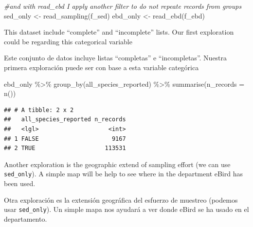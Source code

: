 \documentclass[
]{article}
\newenvironment{Shaded}{\begin{snugshade}}{\end{snugshade}}
\newcommand{\AttributeTok}[1]{\textcolor[rgb]{0.77,0.63,0.00}{#1}}
\newcommand{\CommentTok}[1]{\textcolor[rgb]{0.56,0.35,0.01}{\textit{#1}}}
\newcommand{\FunctionTok}[1]{\textcolor[rgb]{0.00,0.00,0.00}{#1}}
\newcommand{\NormalTok}[1]{#1}
\newcommand{\OtherTok}[1]{\textcolor[rgb]{0.56,0.35,0.01}{#1}}
\newcommand{\SpecialCharTok}[1]{\textcolor[rgb]{0.00,0.00,0.00}{#1}}
\begin{document}
\begin{Shaded}
\begin{Highlighting}[]
\CommentTok{\#and with read\_ebd I apply another filter to do not repeate records from groups}
\NormalTok{sed\_only }\OtherTok{\textless{}{-}} \FunctionTok{read\_sampling}\NormalTok{(f\_sed)}
\NormalTok{ebd\_only }\OtherTok{\textless{}{-}} \FunctionTok{read\_ebd}\NormalTok{(f\_ebd)}
\end{Highlighting}
\end{Shaded}

This dataset include ``complete'' and ``incomplete'' lists. Our first
exploration could be regarding this categorical variable

Este conjunto de datos incluye listas ``completas'' e ``incompletas''.
Nuestra primera exploración puede ser con base a esta variable
categórica

\begin{Shaded}
\begin{Highlighting}[]
\NormalTok{ebd\_only }\SpecialCharTok{\%\textgreater{}\%}
  \FunctionTok{group\_by}\NormalTok{(all\_species\_reported) }\SpecialCharTok{\%\textgreater{}\%}
  \FunctionTok{summarise}\NormalTok{(}\AttributeTok{n\_records =} \FunctionTok{n}\NormalTok{())}
\end{Highlighting}
\end{Shaded}

\begin{verbatim}
## # A tibble: 2 x 2
##   all_species_reported n_records
##   <lgl>                    <int>
## 1 FALSE                     9167
## 2 TRUE                    113531
\end{verbatim}

Another exploration is the geographic extend of sampling effort (we can
use \texttt{sed\_only}). A simple map will be help to see where in the
department eBird has been used.

Otra exploración es la extensión geográfica del esfuerzo de muestreo
(podemos usar \texttt{sed\_only}). Un simple mapa nos ayudará a ver
donde eBird se ha usado en el departamento.
\end{document}
